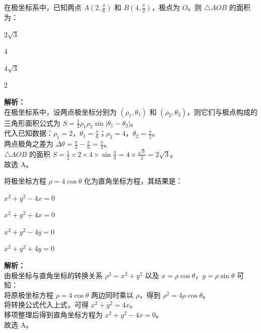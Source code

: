 \documentclass[12pt,a4paper]{exam-zh}
\begin{document}
\begin{question}
    在极坐标系中，已知两点 $A(2, \frac{\pi}{6})$ 和 $B(4, \frac{\pi}{2})$，极点为 $O$。则 $\triangle AOB$ 的面积为： \paren[A]
    \begin{choices}
        \item $2\sqrt{3}$ \item $4$ \item $4\sqrt{3}$ \item $2$
    \end{choices}
\end{question}

\begin{solution}
    \textbf{解析：} \\
    在极坐标系中，设两点极坐标分别为 $(\rho_1, \theta_1)$ 和 $(\rho_2, \theta_2)$，则它们与极点构成的三角形面积公式为 $S = \frac{1}{2} \rho_1 \rho_2 \sin|\theta_1 - \theta_2|$。 \\
    代入已知数据：$\rho_1 = 2$，$ \theta_1 = \frac{\pi}{6}$；$\rho_2 = 4$，$ \theta_2 = \frac{\pi}{2}$。 \\
    两点极角之差为 $\Delta\theta = \frac{\pi}{2} - \frac{\pi}{6} = \frac{\pi}{3}$。 \\
    $\triangle AOB$ 的面积 $S = \frac{1}{2} \times 2 \times 4 \times \sin\frac{\pi}{3} = 4 \times \frac{\sqrt{3}}{2} = 2\sqrt{3}$。 \\
    故选 A。
\end{solution}

\begin{question}
    将极坐标方程 $\rho = 4\cos\theta$ 化为直角坐标方程，其结果是： \paren[A]
    \begin{choices}
        \item $x^2 + y^2 - 4x = 0$ \item $x^2 + y^2 + 4x = 0$ \item $x^2 + y^2 - 4y = 0$ \item $x^2 + y^2 + 4y = 0$
    \end{choices}
\end{question}

\begin{solution}
    \textbf{解析：} \\
    由极坐标与直角坐标的转换关系 $\rho^2 = x^2 + y^2$ 以及 $x = \rho\cos\theta$，$y = \rho\sin\theta$ 可知： \\
    将原极坐标方程 $\rho = 4\cos\theta$ 两边同时乘以 $\rho$，得到 $\rho^2 = 4\rho\cos\theta$。 \\
    将转换公式代入上式，可得 $x^2 + y^2 = 4x$。 \\
    移项整理后得到直角坐标方程为 $x^2 + y^2 - 4x = 0$。 \\
    故选 A。
\end{solution}
\end{document}
